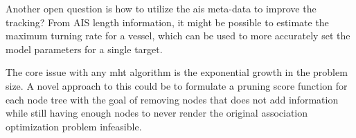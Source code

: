 Another open question is how to utilize the \gls{ais} meta-data to improve the tracking? From AIS length information, it might be possible to estimate the maximum turning rate for a vessel, which can be used to more accurately set the model parameters for a single target.

The core issue with any \gls{mht} algorithm is the exponential growth in the problem size. A novel approach to this could be to formulate a pruning score function for each node tree with the goal of removing nodes that does not add information while still having enough nodes to never render the original association optimization problem infeasible.